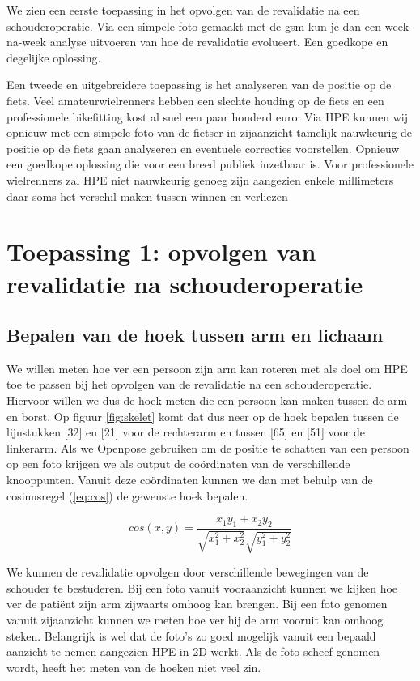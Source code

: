 \documentclass{article}
\begin{document}
We zien een eerste toepassing in het opvolgen van de revalidatie na een schouderoperatie. Via een simpele foto gemaakt met de gsm kun je dan een week-na-week analyse uitvoeren van hoe de revalidatie evolueert. Een goedkope en degelijke oplossing.

Een tweede en uitgebreidere toepassing is het analyseren van de positie op de fiets. Veel amateurwielrenners hebben een slechte houding op de fiets en een professionele bikefitting kost al snel een paar honderd euro. Via HPE kunnen wij opnieuw met een simpele foto van de fietser in zijaanzicht tamelijk nauwkeurig de positie op de fiets gaan analyseren en eventuele correcties voorstellen. Opnieuw een goedkope oplossing die voor een breed publiek inzetbaar is. Voor professionele wielrenners zal HPE niet nauwkeurig genoeg zijn aangezien enkele millimeters daar soms het verschil maken tussen winnen en verliezen

\section{Toepassing 1: opvolgen van revalidatie na schouderoperatie}
	\subsection{Bepalen van de hoek tussen arm en lichaam}

We willen meten hoe ver een persoon zijn arm kan roteren met als doel om HPE toe te passen bij het opvolgen van de revalidatie na een schouderoperatie. Hiervoor willen we dus de hoek meten die een persoon kan maken tussen de arm en borst. Op figuur \ref{fig:skelet} komt dat dus neer op de hoek bepalen tussen de lijnstukken [32] en [21] voor de rechterarm en tussen [65] en [51] voor de linkerarm. Als we Openpose gebruiken om de positie te schatten van een persoon op een foto krijgen we als output de coördinaten van de verschillende knooppunten. Vanuit deze coördinaten kunnen we dan met behulp van de cosinusregel (\ref{eq:cos}) de gewenste hoek bepalen.

\begin{equation}
	cos(x,y) = \frac{x_1y_1+x_2y_2}{\sqrt{x_1^2+x_2^2} \sqrt{y_1^2+y_2^2}}
	\label{eq:cos}
\end{equation}

We kunnen de revalidatie opvolgen door verschillende bewegingen van de schouder te bestuderen. Bij een foto vanuit vooraanzicht kunnen we kijken hoe ver de patiënt zijn arm zijwaarts omhoog kan brengen. Bij een foto genomen vanuit zijaanzicht kunnen we meten hoe ver hij de arm vooruit kan omhoog steken. Belangrijk is wel dat de foto's zo goed mogelijk vanuit een bepaald aanzicht te nemen aangezien HPE in 2D werkt. Als de foto scheef genomen wordt, heeft het meten van de hoeken niet veel zin.
\end{document}
